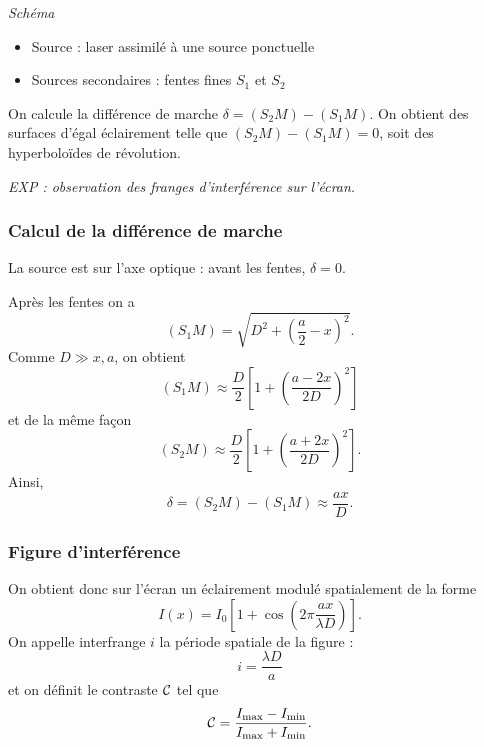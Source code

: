 \emph{Schéma}
\begin{itemize}
\item Source : laser assimilé à une source ponctuelle
\item Sources secondaires : fentes fines $S_1$ et $S_2$
\end{itemize}

On calcule la différence de marche $\delta = (S_2M)-(S_1M)$.
On obtient des surfaces d'égal éclairement telle que $(S_2M)-(S_1M) = 0$, soit des hyperboloïdes de révolution.

\emph{EXP : observation des franges d'interférence sur l'écran.}

\subsubsection{Calcul de la différence de marche}

La source est sur l'axe optique : avant les fentes, $\delta=0$.

Après les fentes on a 
\begin{equation}
(S_1M) = \sqrt{D^2 + \left(\frac{a}{2} - x\right)^2}.
\end{equation}
Comme $D \gg x, a$, on obtient
\begin{equation}
(S_1M)\approx\frac{D}{2}\left[1+\left(\frac{a-2x}{2D}\right)^2\right]
\end{equation}
et de la même façon
\begin{equation}
(S_2M) \approx \frac{D}{2}\left[1+\left(\frac{a+2x}{2D}\right)^2\right].
\end{equation}
Ainsi,
\begin{equation}
\delta = (S_2M) - (S_1M) \approx \frac{ax}{D}.
\end{equation}

\subsubsection{Figure d'interférence}

On obtient donc sur l'écran un éclairement modulé spatialement de la forme
\begin{equation}
I(x) = I_0 \left[1+\cos\left(2\pi\frac{ax}{\lambda D}\right) \right].
\end{equation}
On appelle interfrange $i$ la période spatiale de la figure :
\begin{equation}
i = \frac{\lambda D}{a}
\end{equation}
et on définit le contraste ${\cal{C}}$ tel que
\begin{equation}
{\cal{C}} = \frac{I_\mathrm{max}-I_\mathrm{min}}{I_\mathrm{max}+I_\mathrm{min}}.
\end{equation}

